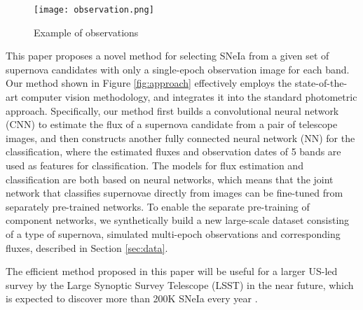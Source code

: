 \documentclass[conference,compsoc]{IEEEtran}
\begin{document}
\begin{figure}[t]
  \begin{center}
    \texttt{[image: observation.png]}
    \end{center}
  \caption{Example of observations}
  \label{fig:observation}
\end{figure}

  This paper proposes a novel method for selecting SNeIa from a given set of supernova candidates with only a single-epoch observation image for each band.
  Our method shown in Figure \ref{fig:approach} effectively employs the state-of-the-art computer vision methodology, and integrates it into the standard photometric approach.
  Specifically, our method first builds a convolutional neural network (CNN) to estimate the flux of a supernova candidate from a pair of telescope images, and then constructs another fully connected neural network (NN) for the classification, where the estimated fluxes and observation dates of 5 bands are used as features for classification.
  The models for flux estimation and classification are both based on neural networks, which means that the joint network that classifies supernovae directly from images can be fine-tuned from separately pre-trained networks.
  To enable the separate pre-training of component networks, we synthetically build a new large-scale dataset consisting of a type of supernova, simulated multi-epoch observations and corresponding fluxes, described in Section \ref{sec:data}.

  The efficient method proposed in this paper will be useful for a larger US-led survey by the Large Synoptic Survey Telescope (LSST) in the near future, which is expected to discover more than 200K SNeIa every year \cite{LSSTScienceCollaboration2009}.


\end{document}
